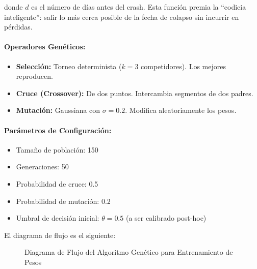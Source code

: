 donde $d$ es el número de días antes del crash. Esta función premia la ``codicia inteligente'': salir lo más cerca posible de la fecha de colapso sin incurrir en pérdidas.

\paragraph{Operadores Genéticos:}
\begin{itemize}
    \item \textbf{Selección:} Torneo determinista ($k=3$ competidores). Los mejores reproducen.
    \item \textbf{Cruce (Crossover):} De dos puntos. Intercambia segmentos de dos padres.
    \item \textbf{Mutación:} Gaussiana con $\sigma=0.2$. Modifica aleatoriamente los pesos.
\end{itemize}

\paragraph{Parámetros de Configuración:}
\begin{itemize}
    \item Tamaño de población: 150
    \item Generaciones: 50
    \item Probabilidad de cruce: 0.5
    \item Probabilidad de mutación: 0.2
    \item Umbral de decisión inicial: $\theta = 0.5$ (a ser calibrado post-hoc)
\end{itemize}

El diagrama de flujo es el siguiente:

\begin{figure}[H]
\centering
{}
\caption{Diagrama de Flujo del Algoritmo Genético para Entrenamiento de Pesos}
\end{figure}

